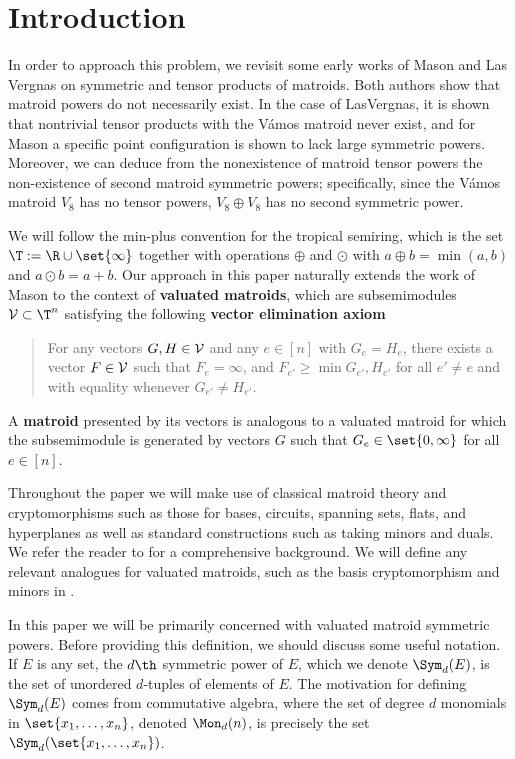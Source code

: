 \section{Introduction}\label{sec:intro}


In order to approach this problem, we revisit some early works of Mason \cite{MGlueing} and Las Vergnas \cite{LV81} on symmetric and tensor products of matroids. Both authors show that matroid powers do not necessarily exist. In the case of LasVergnas, it is shown that nontrivial tensor products with the V\'amos matroid never exist, and for Mason a specific point configuration is shown to lack large symmetric powers. Moreover, we can deduce from the nonexistence of matroid tensor powers the non-existence of second matroid symmetric powers; specifically, since the V\'amos matroid $V_8$ has no tensor powers, $V_8\oplus V_8$ has no second symmetric power.

We will follow the min-plus convention for the tropical semiring, which is the set $\T:= \R\cup \set{\infty}$ together with operations $\oplus$ and $\odot$ with $a\oplus b= \min(a,b)$ and $a\odot b = a+b$. Our approach in this paper naturally extends the work of Mason to the context of \textbf{valuated matroids}, which are subsemimodules $\sV\subset \T^n$ satisfying the following \textbf{vector elimination axiom}
    \begin{quote}
        For any vectors $G,H\in \mathcal{V}$ and any $e\in [n]$ with $G_e=H_e$, there exists a vector $F\in \mathcal{V}$ such that $F_e=\infty$, and $F_{e'}\geq\min{G_{e'},H_{e'}}$ for all $e'\neq e$ and with equality whenever $G_{e'}\neq H_{e'}$.
    \end{quote}
A \textbf{matroid} presented by its vectors is analogous to a valuated matroid for which the subsemimodule is generated by vectors $G$ such that $G_e\in \set{0,\infty}$ for all $e\in [n]$.

Throughout the paper we will make use of classical matroid theory and cryptomorphisms such as those for bases, circuits, spanning sets, flats, and hyperplanes as well as standard constructions such as taking minors and duals. We refer the reader to \cite{Oxley06} for a comprehensive background. We will define any relevant analogues for valuated matroids, such as the basis cryptomorphism and minors in .

In this paper we will be primarily concerned with valuated matroid symmetric powers. Before providing this definition, we should discuss some useful notation. If $E$ is any set, the $d\th$ symmetric power of $E$, which we denote $\Sym_d(E)$, is the set of unordered $d$-tuples of elements of $E$. The motivation for defining $\Sym_d(E)$ comes from commutative algebra, where the set of degree $d$ monomials in $\set{x_1,\dots,x_n}$, denoted $\Mon_d(n)$, is precisely the set $\Sym_d(\set{x_1,\dots,x_n})$.

